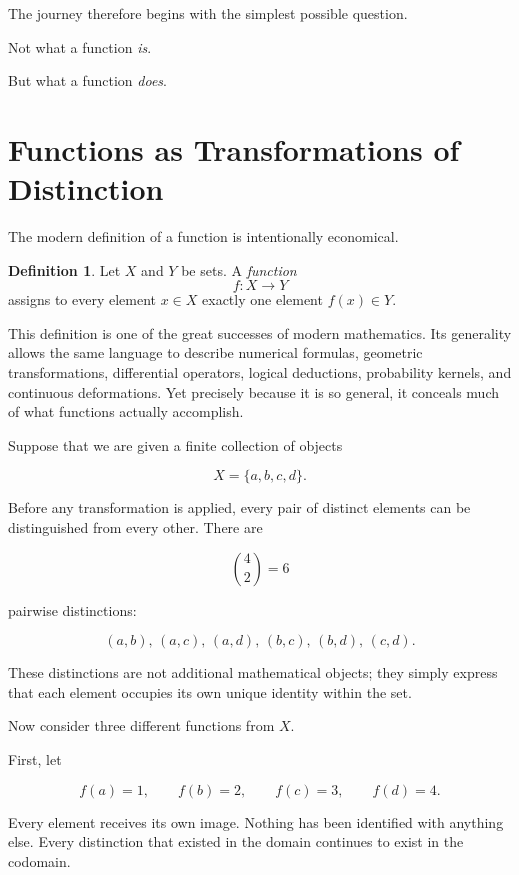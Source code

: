 \documentclass[11pt]{book}
\numberwithin{equation}{chapter}
\theoremstyle{definition}
\newtheorem{definition}{Definition}[chapter]
\theoremstyle{plain}
\theoremstyle{remark}
\begin{document}
The journey therefore begins with the simplest possible question.

Not what a function \emph{is}.

But what a function \emph{does}.


\section{Functions as Transformations of Distinction}

The modern definition of a function is intentionally economical.

\begin{definition}
Let \(X\) and \(Y\) be sets. A \emph{function}
\[
f:X\rightarrow Y
\]
assigns to every element \(x\in X\) exactly one element \(f(x)\in Y\).
\end{definition}

This definition is one of the great successes of modern mathematics. Its generality allows the same language to describe numerical formulas, geometric transformations, differential operators, logical deductions, probability kernels, and continuous deformations. Yet precisely because it is so general, it conceals much of what functions actually accomplish.

Suppose that we are given a finite collection of objects

\[
X=\{a,b,c,d\}.
\]

Before any transformation is applied, every pair of distinct elements can be distinguished from every other. There are

\[
\binom{4}{2}=6
\]

pairwise distinctions:

\[
(a,b),\,
(a,c),\,
(a,d),\,
(b,c),\,
(b,d),\,
(c,d).
\]

These distinctions are not additional mathematical objects; they simply express that each element occupies its own unique identity within the set.

Now consider three different functions from \(X\).

First, let

\[
f(a)=1,\qquad
f(b)=2,\qquad
f(c)=3,\qquad
f(d)=4.
\]

Every element receives its own image. Nothing has been identified with anything else. Every distinction that existed in the domain continues to exist in the codomain.
\end{document}
